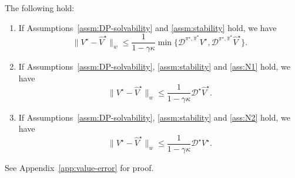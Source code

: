 \documentclass[letterpaper, 10pt]{IEEEtran}
\newcommand*\MISMATCH{\mathscr{D}}
\begin{document}
\begin{lemma}\label{lem:value-error}
    The following hold:
    \begin{enumerate}
        \item
         If Assumptions~\ref{assm:DP-solvability} and \ref{assm:stability} hold, we have
        \begin{equation}\label{eq:N0}
            \| V^\star - \hat V^\star \|_w \le \frac 1{1 - \gamma \kappa} 
            \min\{ 
            \MISMATCH^{\pi^\star, \hat \pi^\star} V^\star,
            \MISMATCH^{\pi^\star, \hat \pi^\star} \hat V^\star
            \}.
        \end{equation}
        \item If Assumptions~\ref{assm:DP-solvability}, \ref{assm:stability} and \ref{ass:N1}  hold, we have
        \begin{equation}\label{eq:N1}
            \| V^\star - \hat V^\star \|_w \le \frac 1{1 - \gamma \kappa} \MISMATCH^\star \hat V^\star.
        \end{equation}
        \item If Assumptions~\ref{assm:DP-solvability}, \ref{assm:stability} and \ref{ass:N2}  hold, we have
            \begin{equation}\label{eq:N2}
                \| V^\star - \hat V^\star \|_w \le \frac 1{1 - \gamma \kappa} \MISMATCH^\star V^\star.
            \end{equation}
    \end{enumerate}
\end{lemma}
See Appendix~\ref{app:value-error} for proof.
\end{document}
